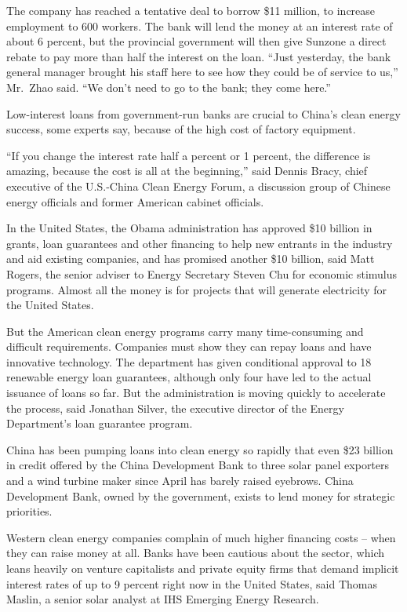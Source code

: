 ﻿\documentclass[12pt]{article}
\begin{document}
The company has reached a tentative deal to borrow \$11 million, to increase employment to 600
workers. The bank will lend the money at an interest rate of about 6 percent, but the provincial
government will then give Sunzone a direct rebate to pay more than half the interest on the loan.
``Just yesterday, the bank general manager brought his staff here to see how they could be of
service to us,'' Mr.~Zhao said. ``We don't need to go to the bank; they come here.''

Low-interest loans from government-run banks are crucial to China's clean energy success, some
experts say, because of the high cost of factory equipment.

``If you change the interest rate half a percent or 1 percent, the difference is amazing, because
the cost is all at the beginning,'' said Dennis Bracy, chief executive of the U.S.-China Clean
Energy Forum, a discussion group of Chinese energy officials and former American cabinet officials.

In the United States, the Obama administration has approved \$10 billion in grants, loan guarantees
and other financing to help new entrants in the industry and aid existing companies, and has
promised another \$10 billion, said Matt Rogers, the senior adviser to Energy Secretary Steven Chu
for economic stimulus programs. Almost all the money is for projects that will generate electricity
for the United States.

But the American clean energy programs carry many time-consuming and difficult requirements.
Companies must show they can repay loans and have innovative technology. The department has given
conditional approval to 18 renewable energy loan guarantees, although only four have led to the
actual issuance of loans so far. But the administration is moving quickly to accelerate the process,
said Jonathan Silver, the executive director of the Energy Department's loan guarantee program.

China has been pumping loans into clean energy so rapidly that even \$23 billion in credit offered
by the China Development Bank to three solar panel exporters and a wind turbine maker since April
has barely raised eyebrows. China Development Bank, owned by the government, exists to lend money
for strategic priorities.

Western clean energy companies complain of much higher financing costs -- when they can raise money
at all. Banks have been cautious about the sector, which leans heavily on venture capitalists and
private equity firms that demand implicit interest rates of up to 9 percent right now in the United
States, said Thomas Maslin, a senior solar analyst at IHS Emerging Energy Research.
\end{document}
